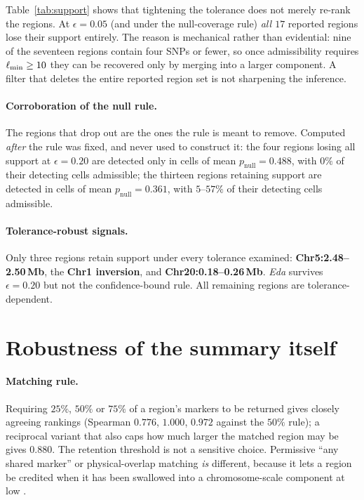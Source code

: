 Table~\ref{tab:support} shows that tightening the tolerance does not merely re-rank
the regions. At $\epsilon=0.05$ (and under the null-coverage rule) \emph{all $17$}
reported regions lose their support entirely. The reason is mechanical rather than
evidential: nine of the seventeen regions contain four SNPs or fewer, so once
admissibility requires $\ell_{\min}\ge10$ they can be recovered only by merging into a
larger component. A filter that deletes the entire reported region set is not
sharpening the inference.

\paragraph{Corroboration of the null rule.} The regions that drop out are the ones the
rule is meant to remove. Computed \emph{after} the rule was fixed, and never used to
construct it: the four regions losing all support at $\epsilon=0.20$ are detected only
in cells of mean $p_{\text{null}}=0.488$, with $0\%$ of their detecting cells
admissible; the thirteen regions retaining support are detected in cells of mean
$p_{\text{null}}=0.361$, with $5$--$57\%$ of their detecting cells admissible.

\paragraph{Tolerance-robust signals.} Only three regions retain support under every
tolerance examined: \textbf{Chr5:2.48--2.50\,Mb}, the \textbf{Chr1 inversion}, and
\textbf{Chr20:0.18--0.26\,Mb}. \emph{Eda} survives $\epsilon=0.20$ but not the
confidence-bound rule. All remaining regions are tolerance-dependent.

\section{Robustness of the summary itself}

\paragraph{Matching rule.} Requiring $25\%$, $50\%$ or $75\%$ of a region's markers to
be returned gives closely agreeing rankings (Spearman $0.776$, $1.000$, $0.972$
against the $50\%$ rule); a reciprocal variant that also caps how much larger the
matched region may be gives $0.880$. The retention threshold is not a sensitive
choice. Permissive ``any shared marker'' or physical-overlap matching \emph{is}
different, because it lets a region be credited when it has been swallowed into a
chromosome-scale component at low \tauc.

